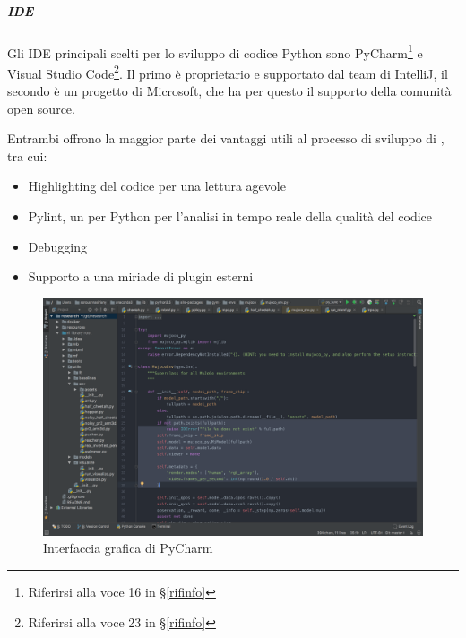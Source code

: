 	    \subparagraph{IDE}\label{PP:Sviluppo:Strumenti:AmbienteSviluppo:IDE} %
		Gli IDE principali scelti per lo sviluppo di codice Python sono
		{PyCharm}\footnote{Riferirsi alla voce
		16
		 in \S\ref{rifinfo}} e
		{Visual Studio Code}\footnote{Riferirsi alla voce
		23
		  in \S\ref{rifinfo}}.
		Il primo è proprietario e supportato dal team di IntelliJ, il secondo è un progetto  di Microsoft, che ha
		per questo il supporto della comunità open source.\par
		Entrambi offrono la maggior parte dei vantaggi utili al processo di sviluppo di \progetto, tra cui:
		\begin{itemize}
			\item Highlighting del codice per una lettura agevole
			\item Pylint, un  per Python per l'analisi in tempo reale della qualità del codice
			\item Debugging
			\item Supporto a una miriade di plugin esterni
		\end{itemize}

		\begin{figure}[H]
			\includegraphics[width=\textwidth]{img/pycharm.png}
			\caption{Interfaccia grafica di PyCharm}
		\end{figure}
